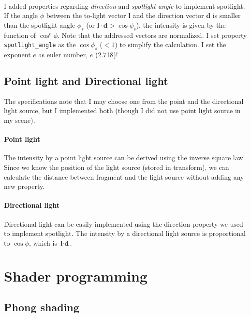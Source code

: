 \documentclass[10pt,a4paper]{article}
\begin{document}
	\paragraph{}
	I added properties regarding \textit{direction} and \textit{spotlight angle} to implement spotlight. If the angle $ \phi $ between the to-light vector $ \textbf{l} $ and the direction vector $ \textbf{d} $ is smaller than the spotlight angle $ \phi_s $ (or $ \textbf{l} \cdot \textbf{d} > \cos \phi_s$), the intensity is given by the function of $ \cos^e\phi $. Note that the addressed vectors are normalized. I set property \texttt{spotlight\_angle} as the $ \cos \phi_s $ ($ < 1$) to simplify the calculation. I set the exponent $ e $ as euler number, $ e $ (2.718)!
	
	\subsection{Point light and Directional light}
	
	The specifications note that I may choose one from the point and the directional light source, but I implemented both (though I did not use point light source in my scene).
	 
	\paragraph{Point light}
	The intensity by a point light source can be derived using the inverse square law. Since we know the position of the light source (stored in transform), we can calculate the distance between fragment and the light source without adding any new property.
	
	\paragraph{Directional light}
	Directional light can be easily implemented using the direction property we used to implement spotlight. The intensity by a directional light source is proportional to $ \cos \phi $, which is $ \textbf{l} \cdot \textbf{d} $.

	\section{Shader programming}
	
	\subsection{Phong shading}
\end{document}
